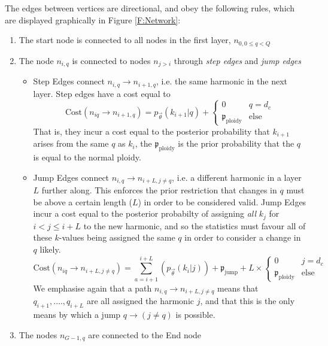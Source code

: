 \documentclass[fleqn,usenatbib]{acmart}
\begin{document}
				The edges between vertices are directional, and obey the following rules, which are displayed graphically in Figure \ref{F:Network}:
				\begin{enumerate}
					\item The start node is connected to all nodes in the first layer, $n_{0,0\leq q < Q}$ 
					\item The node $n_{i,q}$ is connected to nodes $n_{j>i}$ through \textit{step edges} and \textit{jump edges}
					\begin{itemize}
						\item Step Edges connect $n_{i,q} \to n_{i+1,q}$, i.e. the same harmonic in the next layer. Step edges have a cost equal to
						\begin{equation}
							\text{Cost}(n_{iq} \to n_{i+1,q}) = p_{\vec{\theta}}(k_{i+1} | q) + \begin{cases} 0 & q = d_c \\  \mathfrak{p}_\text{ploidy} & \text{else} \end{cases}
						\end{equation}
						That is, they incur a cost equal to the posterior probability that $k_{i+1}$ arises from the same $q$ as $k_i$, the $\mathfrak{p}_\text{ploidy}$ is the prior probability that the $q$ is equal to the normal ploidy.
						\item Jump Edges connect $n_{i,q} \to n_{i+L,j\neq q}$, i.e. a different harmonic in a layer $L$ further along. This enforces the prior restriction that changes in $q$ must be above a certain length ($L$) in order to be considered valid. Jump Edges incur a cost equal to the posterior probabilty of assigning \textit{all} $k_{j}$ for $i < j \leq i + L$ to the new harmonic, and so the statistics must favour all of these $k$-values being assigned the same $q$ in order to consider a change in $q$ likely.
						\begin{equation}
							\text{Cost}(n_{iq} \to n_{i+L,j\neq q}) =\sum_{a = i+1}^{i+L} \left( p_{\vec{\theta}}(k_i | j) \right) +  \mathfrak{p}_\text{jump} + L \times  \begin{cases} 0 & j = d_c \\  \mathfrak{p}_\text{ploidy} & \text{else} \end{cases}
						\end{equation}
						We emphasise again that a path $n_{i,q} \to n_{i+L,j\neq q}$ means that $q_{i+1},....,q_{i+L}$ are all assigned the harmonic $j$, and that this is the only means by which a jump $q\to (j\neq q)$ is possible.
					\end{itemize}
					\item The nodes $n_{G-1,q}$ are connected to the End node
				\end{enumerate}
				
\end{document}
